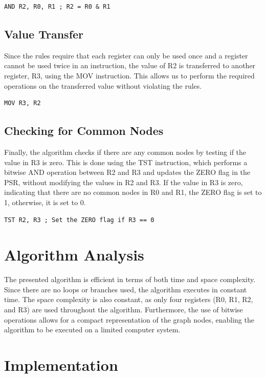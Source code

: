 \begin{verbatim}
AND R2, R0, R1 ; R2 = R0 & R1
\end{verbatim}

\subsection{Value Transfer}

Since the rules require that each register can only be used once and a register cannot be used twice in an instruction, the value of R2 is transferred to another register, R3, using the MOV instruction. This allows us to perform the required operations on the transferred value without violating the rules.

\begin{verbatim}
MOV R3, R2
\end{verbatim}

\subsection{Checking for Common Nodes}

Finally, the algorithm checks if there are any common nodes by testing if the value in R3 is zero. This is done using the TST instruction, which performs a bitwise AND operation between R2 and R3 and updates the ZERO flag in the PSR, without modifying the values in R2 and R3. If the value in R3 is zero, indicating that there are no common nodes in R0 and R1, the ZERO flag is set to 1, otherwise, it is set to 0.

\begin{verbatim}
TST R2, R3 ; Set the ZERO flag if R3 == 0
\end{verbatim}

\section{Algorithm Analysis}

The presented algorithm is efficient in terms of both time and space complexity. Since there are no loops or branches used, the algorithm executes in constant time. The space complexity is also constant, as only four registers (R0, R1, R2, and R3) are used throughout the algorithm. Furthermore, the use of bitwise operations allows for a compact representation of the graph nodes, enabling the algorithm to be executed on a limited computer system.



\section{Implementation}

